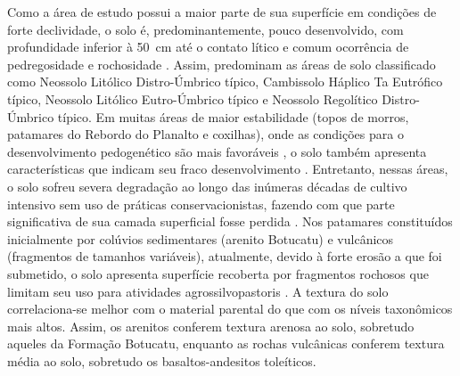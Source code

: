 
Como a área de estudo possui a maior parte de sua superfície em condições de forte declividade, o solo é, 
predominantemente, pouco desenvolvido, com profundidade inferior à \SI{50}{\cm} até o contato lítico e comum 
ocorrência de pedregosidade e rochosidade \cite{Miguel2010}. Assim, predominam as áreas de solo classificado 
como Neossolo Litólico Distro-Úmbrico típico, Cambissolo Háplico Ta Eutrófico típico, Neossolo Litólico 
Eutro-Úmbrico típico e Neossolo Regolítico Distro-Úmbrico típico. Em muitas áreas de maior estabilidade (topos 
de morros, patamares do Rebordo do Planalto e coxilhas), onde as condições para o desenvolvimento pedogenético 
são mais favoráveis \cite{Moser1990}, o solo também apresenta características que indicam seu fraco 
desenvolvimento \cite{MouraBueno2012}. Entretanto, nessas áreas, o solo sofreu severa degradação ao longo das 
inúmeras décadas de cultivo intensivo sem uso de práticas conservacionistas, fazendo com que parte 
significativa de sua camada superficial fosse perdida \cite{SamuelRosaEtAl2011a}. Nos patamares constituídos 
inicialmente por colúvios sedimentares (arenito Botucatu) e vulcânicos (fragmentos de tamanhos variáveis), 
atualmente, devido à forte erosão a que foi submetido, o solo apresenta superfície recoberta por fragmentos 
rochosos que limitam seu uso para atividades agrossilvopastoris \cite{MouraBueno2012}. A textura do solo 
correlaciona-se melhor com o material parental do que com os níveis taxonômicos mais altos. Assim, os arenitos 
conferem textura arenosa ao solo, sobretudo aqueles da Formação Botucatu, enquanto as rochas vulcânicas 
conferem textura média ao solo, sobretudo os 
basaltos-andesitos toleíticos.


